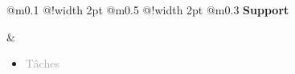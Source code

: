 \documentclass{article}
\begin{document}
\begin{tabular}
    {
        @{}m{}
        @{\hspace{0.001\textwidth}}!{\color{secondaryBlue}\vline width 2pt} %
        @{}m{0.5\textwidth}
        @{\hspace{0.025\textwidth}}!{\color{secondaryBlue}\vline width 2pt} %
        @{{\hspace{0.001\textwidth}}}m{0.3\textwidth}
    }
    \textcolor{secondaryBlue}
    {
        \textbf{Support}
    } 

    &
    \begin{itemize}
        [label={}, topsep=8pt, partopsep=0pt, itemsep=0.5pt, parsep=2pt,after=\vspace*{-\baselineskip}]
        \setlength{\itemsep}{10pt}
        \item \textcolor{darkGray}{Tâches}
        \begin{itemize}
        [label={\textcolor{gray!80}{\checkmark}}, topsep=8pt, partopsep=0pt, itemsep=0.5pt, parsep=2pt, after=\vspace*{-\baselineskip}] 


\end{itemize}
\end{itemize}
\end{tabular}
\end{document}
